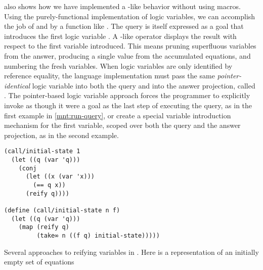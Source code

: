 \documentclass[sigplan,balance=true,pbalance=true,natbib=false]{acmart}
\begin{document}
 also shows how we have
implemented a -like behavior without using macros.
Using the purely-functional implementation of logic variables, we can
accomplish the job of  and  by a
function like . The query is itself
expressed as a goal that introduces the first logic
variable . A -like operator displays the
result with respect to the first variable introduced. This means pruning
superfluous variables from the answer, producing a single value from
the accumulated equations, and numbering the fresh variables. When
logic variables are only identified by reference equality, the
language implementation must pass the same \emph{pointer-identical} logic
variable into both the query and into the answer projection,
called . The pointer-based logic variable approach
forces the programmer to explicitly invoke  as
though it were a goal as the last step of executing the query, as in
the first example in \cref{mnt:run-query}, or create a special
variable introduction mechanism for the first variable, scoped over
both the query and the answer projection, as in the second example.

\begin{listing}[h]
  \begin{verbatim}
(call/initial-state 1
  (let ((q (var 'q)))
    (conj
      (let ((x (var 'x)))
        (== q x))
      (reify q))))

(define (call/initial-state n f)
  (let ((q (var 'q)))
    (map (reify q)
         (take∞ n ((f q) initial-state)))))
  \end{verbatim}
  \caption{Several approaches to reifying variables in . Here  is a representation of an initially empty set of equations}\label{mnt:run-query}
\end{listing}



\subsection{}
\end{document}

